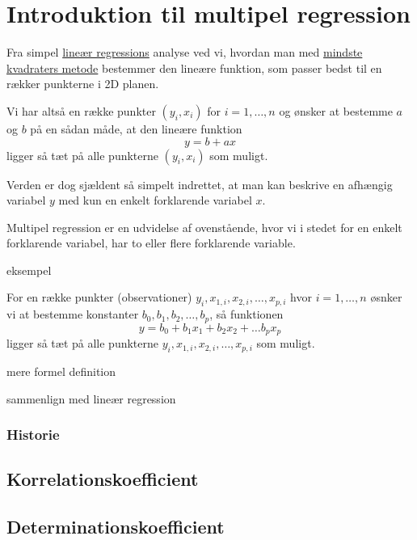 \documentclass[11pt, a4paper]{article}
\begin{document}
\section{Introduktion til multipel regression}

Fra simpel \href{http://www.webmatematik.dk/lektioner/matematik-b/regression}{lineær
regressions} analyse ved vi, hvordan man med
\href{http://www.webmatematik.dk/lektioner/matematik-b/regression}{mindste kvadraters metode}
bestemmer den lineære funktion, som passer bedst til en rækker punkterne i 2D planen.

Vi har altså en række punkter \((y_i, x_i)\) for \(i=1,\ldots,n\) og ønsker at bestemme
\(a\) og \(b\) på en sådan måde, at den lineære funktion
\begin{displaymath}
  y = b + a x
\end{displaymath}
ligger så tæt på alle punkterne \((y_i, x_i)\) som muligt.

Verden er dog sjældent så simpelt indrettet, at man kan beskrive en afhængig variabel \(y\)
med kun en enkelt forklarende variabel \(x\).

Multipel regression er en udvidelse af ovenstående, hvor vi i stedet for en enkelt forklarende
variabel, har to eller flere forklarende variable.

eksempel

For en række punkter (observationer) \(y_i,x_{1,i},x_{2,i},\ldots,x_{p,i}\) hvor \(i=1,\ldots,n\) øsnker vi
at bestemme konstanter \(b_0,b_1,b_2,\ldots,b_p\), så funktionen
\begin{displaymath}
  y = b_0 + b_1 x_1 + b_2 x_2 + \dots b_p x_p
\end{displaymath}
ligger så tæt på alle punkterne \(y_i,x_{1,i},x_{2,i},\ldots,x_{p,i}\) som muligt.


mere formel definition

sammenlign med lineær regression

\subsubsection{Historie}


\subsection{Korrelationskoefficient}

\subsection{Determinationskoefficient}
\end{document}
